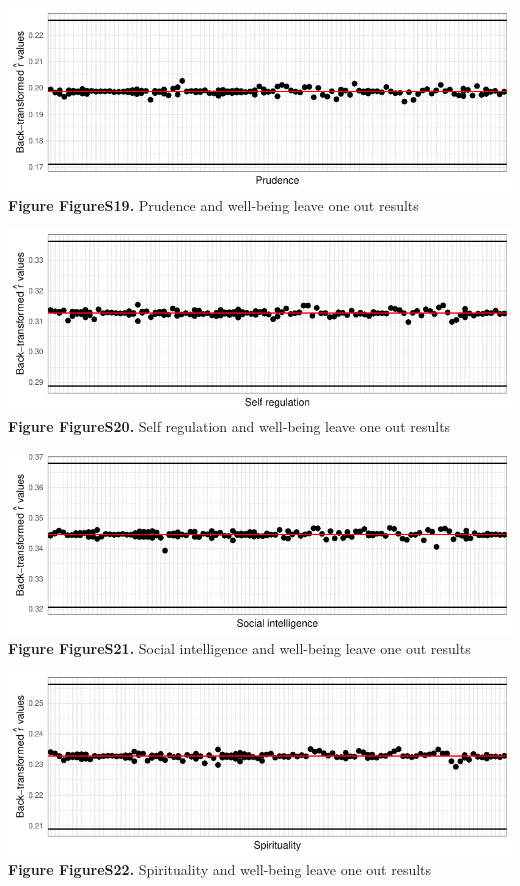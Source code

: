 \documentclass[
  letterpaper,
  DIV=11,
  numbers=noendperiod]{scrartcl}
\begin{document}
\includegraphics{SupplementaryResults_files/figure-pdf/unnamed-chunk-11-19.pdf}\textbf{Figure
FigureS19.} Prudence and well-being leave one out results

\includegraphics{SupplementaryResults_files/figure-pdf/unnamed-chunk-11-20.pdf}\textbf{Figure
FigureS20.} Self regulation and well-being leave one out results

\includegraphics{SupplementaryResults_files/figure-pdf/unnamed-chunk-11-21.pdf}\textbf{Figure
FigureS21.} Social intelligence and well-being leave one out results

\includegraphics{SupplementaryResults_files/figure-pdf/unnamed-chunk-11-22.pdf}\textbf{Figure
FigureS22.} Spirituality and well-being leave one out results
\end{document}

